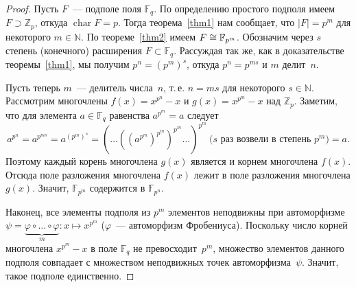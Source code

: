 \documentclass[a4paper,10pt]{amsart}
\newcommand{\xar}{\mathop{\mathrm{char}}}
\def\FF{{\mathbb F}}%
\def\ZZ{{\mathbb Z}}%
\def\NN{{\mathbb N}}%
\theoremstyle{definition}
\theoremstyle{remark}
\begin{document}
\begin{proof}
	Пусть $F$~--- подполе поля $\FF_q$. По определению простого подполя
	имеем $F \supset \ZZ_p$, откуда $\xar F = p$. Тогда
	теорема~\ref{thm1} нам сообщает, что $|F| = p^m$ для некоторого $m
	\in \NN$. По теореме~\ref{thm2} имеем $F \cong\nobreak \FF_{p^m}$.
	Обозначим через $s$ степень (конечного) расширения $F \subset
	\FF_q$. Рассуждая так же, как в доказательстве теоремы~\ref{thm1},
	мы получим $p^n = (p^m)^s$, откуда $p^n = p^{ms}$ и $m$ делит~$n$.
	
	Пусть теперь $m$~--- делитель числа~$n$, т.\,е. $n = ms$ для
	некоторого $s \in \NN$. Рассмотрим многочлены $f(x) = x^{p^n} - x$ и
	$g(x) = x^{p^m} - x$ над $\ZZ_p$. Заметим, что для элемента $a \in
	\FF_q$ равенства $a^{p^m} = a$ следует
	$$
	a^{p^n} = a^{p^{ms}} = a^{(p^m)^s} =
	(\ldots((a^{p^m})^{p^m})^{p^m}\ldots)^{p^m} \ \text{($s$ раз возвели
		в степень $p^m$)} = a.
	$$
	Поэтому каждый корень многочлена $g(x)$ является и корнем многочлена
	$f(x)$. Отсюда поле разложения многочлена $f(x)$ лежит в поле
	разложения многочлена $g(x)$. Значит, $\FF_{p^m}$ содержится в
	$\FF_{p^n}$.
	
	Наконец, все элементы подполя из $p^m$ элементов неподвижны при
	автоморфизме $\psi = \underbrace{\varphi \circ \ldots \circ
		\varphi}_m \colon x \mapsto x^{p^m}$ ($\varphi$~--- автоморфизм
	Фробениуса). Поскольку число корней многочлена $x^{p^m}-x$ в поле
	$\FF_q$ не превосходит~$p^m$, множество элементов данного подполя
	совпадает с множеством неподвижных точек автоморфизма~$\psi$.
	Значит, такое подполе единственно.
\end{proof}
\end{document}
